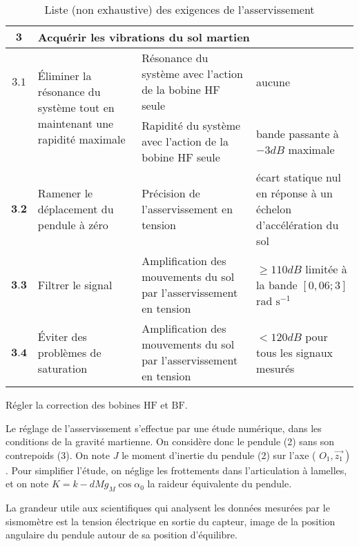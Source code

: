 \begin{table}[!h]
\centering
\begin{tabular}{cp{5cm}p{5cm}p{5cm}}
\hline
$\mathbf{3}$ & \multicolumn{3}{l}{Acquérir les vibrations du sol martien}  \\
\hline
$\mathbf{3.1}$ &\multirow{2}{4cm}{Éliminer la résonance du système tout en maintenant une rapidité maximale}&
Résonance du système avec l'action de la bobine HF seule &  aucune \\
\cline { 3 - 4 }
& & Rapidité du système avec l'action de la bobine HF seule & bande passante à $-3 \si{dB}$ maximale \\
\hline
$\mathbf{3 . 2}$ & 
Ramener le déplacement du pendule à zéro 
& Précision de l'asservissement en tension & écart statique nul en réponse à un échelon d'accélération du sol \\
\hline
$\mathbf{3 . 3}$ & Filtrer le signal & Amplification des mouvements du sol par l'asservissement en tension & 
$\geq 110 \si{dB}$ limitée à la bande $[0,06 ; 3]$ \si{rad} $\mathrm{s}^{-1}$ \\
\hline
$\mathbf{3 . 4}$ & Éviter des problèmes de saturation & Amplification des mouvements du sol par l'asservissement en tension 
&$<120 \si{dB}$ pour tous les signaux mesurés \\
\hline
\end{tabular}
\caption{\label{ccmp2023_tab_03}  Liste (non exhaustive) des exigences de l'asservissement}
\end{table}



\begin{obj}
Régler la correction des bobines $\mathrm{HF}$ et $\mathrm{BF}$.
\end{obj}

Le réglage de l'asservissement s'effectue par une étude numérique, dans les conditions de la gravité martienne. On considère donc le pendule (2) sans son contrepoids (3). On note $J$ le moment d'inertie du pendule (2) sur l'axe ( $\left.O_{1}, \overrightarrow{z_{1}}\right)$. Pour simplifier l'étude, on néglige les frottements dans l'articulation à lamelles, et on note $K=k-d M g_{M} \cos \alpha_{0}$ la raideur équivalente du pendule.

La grandeur utile aux scientifiques qui analysent les données mesurées par le sismomètre est la tension électrique en sortie du capteur, image de la position angulaire du pendule autour de sa position d'équilibre.

